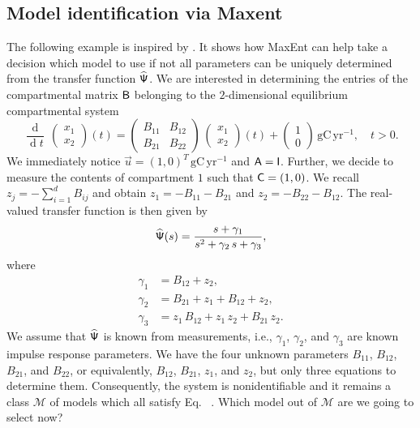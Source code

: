 \documentclass[smallextended]{svjour3}
\makeatletter
\renewcommand*{\eqref}[1]{%
  \hyperref[{#1}]{\textup{\tagform@{\ref*{#1}}}}%
}
\newcommand{\deriv}[1]{\frac{\operatorname{d}}{\operatorname{d}#1}}
\newcommand{\gC}{\mathrm{gC}}
\newcommand{\yr}{\mathrm{yr}}
\newcommand{\ie}{i.e.}
\makeatother
\begin{document}
\subsection{Model identification via Maxent}
  \label{sec:moel_identification}
  The following example is inspired by \citet[Example~16\,C]{Anderson1983}.
  It shows how MaxEnt can help take a decision which model to use if not all parameters can be uniquely determined from the transfer function $\widehat{\mathsf{\Psi}}$.
	We are interested in determining the entries of the compartmental matrix $\mathsf{B}$ belonging to the $2$-dimensional equilibrium compartmental system
	\begin{equation}\label{eqn:opt_example}
        \deriv{t}\,
		\begin{pmatrix} x_1 \\ x_2 \end{pmatrix}(t)
		=
		\begin{pmatrix} B_{11} & B_{12} \\ B_{21} & B_{22} \end{pmatrix}\,
		\begin{pmatrix} x_1 \\ x_2 \end{pmatrix}(t)
		+
		\begin{pmatrix} 1 \\ 0 \end{pmatrix}\,\gC\,\yr^{-1},
		\quad t>0.
	\end{equation}
	We immediately notice $\vec{u}=(1,0)^T\,\gC\,\yr^{-1}$ and $\mathsf{A}=\mathsf{I}$.
	Further, we decide to measure the contents of compartment $1$ such that $\mathsf{C} = (1,0)$.
	We recall $z_j = -\sum_{i=1}^d B_{ij}$ and obtain $z_1 = -B_{11} - B_{21}$ and $z_2 = - B_{22} - B_{12}$.
	The real-valued transfer function is then given by
	\begin{equation*}
		\widehat{\mathsf{\Psi}}(s) = \frac{s + \gamma_1}{s^2+\gamma_2\,s+\gamma_3},
	\end{equation*}
	where
	\begin{equation}\label{eqn:measurement_data}
		\begin{aligned}
			\gamma_1 &= B_{12} + z_2,\\
			\gamma_2 &= B_{21} + z_1 + B_{12} + z_2,\\
			\gamma_3 &= z_1\,B_{12} + z_1\,z_2 + B_{21}\,z_2.
		\end{aligned}
	\end{equation}
	We assume that $\widehat{\mathsf{\Psi}}$ is known from measurements, \ie, $\gamma_1$, $\gamma_2$, and $\gamma_3$ are known impulse response parameters.	
	We have the four unknown parameters $B_{11}$, $B_{12}$, $B_{21}$, and $B_{22}$, or equivalently, $B_{12}$, $B_{21}$, $z_1$, and $z_2$, but only three equations to determine them.
	Consequently, the system is nonidentifiable and it remains a class $\mathcal{M}$ of models which all satisfy Eq.~\eqref{eqn:measurement_data}.
	Which model out of $\mathcal{M}$ are we going to select now?
\end{document}
